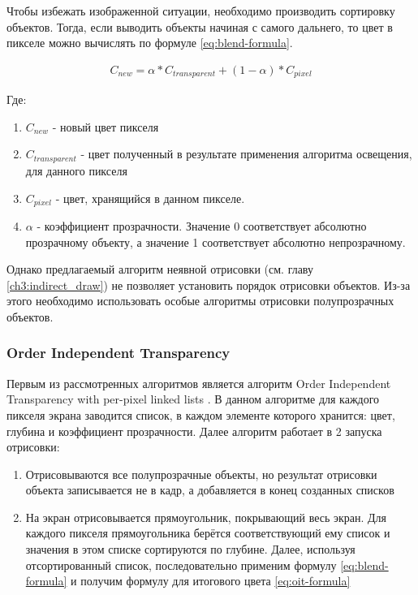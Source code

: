 		Чтобы избежать изображенной ситуации, необходимо производить сортировку объектов. Тогда, если выводить объекты начиная с самого дальнего, то цвет в пикселе можно вычислять по формуле \ref{eq:blend-formula}.
		
		\begin{equation}
			\label{eq:blend-formula}
			\begin{multlined}
				C_{new} = \alpha * C_{transparent} + (1 - \alpha) * C_{pixel}
			\end{multlined}
		\end{equation}
		
		Где:
		\begin{enumerate}[1.]
			\item $C_{new}$ - новый цвет пикселя
			\item $C_{transparent}$ - цвет полученный в результате применения алгоритма освещения, для данного пикселя
			\item $C_{pixel}$ - цвет, хранящийся в данном пикселе.
			\item $\alpha$ - коэффициент прозрачности. Значение 0 соответствует абсолютно прозрачному объекту, а значение 1 соответствует абсолютно непрозрачному.
		\end{enumerate}
		
		Однако предлагаемый алгоритм неявной отрисовки (см. главу \ref{ch3:indirect_draw}) не позволяет установить порядок отрисовки объектов. Из-за этого необходимо использовать особые алгоритмы отрисовки полупрозрачных объектов.		
		
		\subsubsection{Order Independent Transparency} \label{ch3:render_pass:transparents:oit}
			Первым из рассмотренных алгоритмов является алгоритм Order Independent Transparency with per-pixel linked lists \cite{barta2011order}. В данном алгоритме для каждого пикселя экрана заводится список, в каждом элементе которого хранится: цвет, глубина и коэффициент прозрачности. Далее алгоритм работает в 2 запуска отрисовки:
			
			\begin{enumerate}[1.]
				\item Отрисовываются все полупрозрачные объекты, но результат отрисовки объекта записывается не в кадр, а добавляется в конец созданных списков
				\item На экран отрисовывается прямоугольник, покрывающий весь экран. Для каждого пикселя прямоугольника берётся соответствующий ему список и значения в этом списке сортируются по глубине. Далее, используя отсортированный список, последовательно применим формулу \ref{eq:blend-formula} и получим формулу для итогового цвета \ref{eq:oit-formula}
			\end{enumerate}
			
